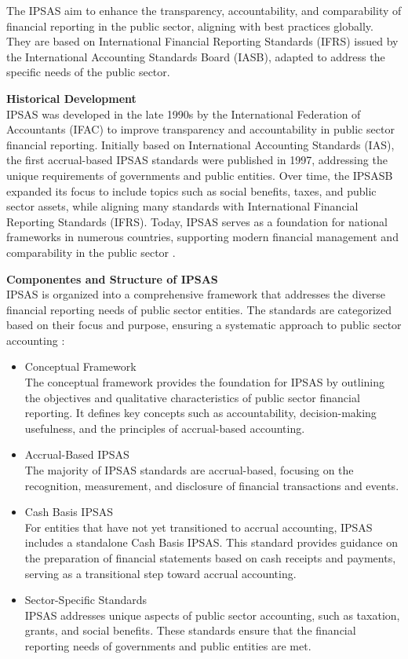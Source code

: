 \documentclass[10pt]{article}
\begin{document}
The IPSAS aim to enhance the transparency, accountability, and comparability of financial reporting in the public sector, aligning with best practices globally. They are based on International Financial Reporting Standards (IFRS) issued by the International Accounting Standards Board (IASB), adapted to address the specific needs of the public sector.

\textbf{Historical Development}\\
IPSAS was developed in the late 1990s by the International Federation of Accountants (IFAC) to improve transparency and accountability in public sector financial reporting. Initially based on International Accounting Standards (IAS), the first accrual-based IPSAS standards were published in 1997, addressing the unique requirements of governments and public entities. Over time, the IPSASB expanded its focus to include topics such as social benefits, taxes, and public sector assets, while aligning many standards with International Financial Reporting Standards (IFRS). Today, IPSAS serves as a foundation for national frameworks in numerous countries, supporting modern financial management and comparability in the public sector \cite{IfacIpsasHistory}.

\textbf{Componentes and Structure of IPSAS}\\
IPSAS is organized into a comprehensive framework that addresses the diverse financial reporting needs of public sector entities. The standards are categorized based on their focus and purpose, ensuring a systematic approach to public sector accounting  \cite{IPSASComoponents}: 

\begin{itemize}
    \item Conceptual Framework\\
The conceptual framework provides the foundation for IPSAS by outlining the objectives and qualitative characteristics of public sector financial reporting. It defines key concepts such as accountability, decision-making usefulness, and the principles of accrual-based accounting.

    \item Accrual-Based IPSAS\\
The majority of IPSAS standards are accrual-based, focusing on the recognition, measurement, and disclosure of financial transactions and events.

    \item Cash Basis IPSAS\\
For entities that have not yet transitioned to accrual accounting, IPSAS includes a standalone Cash Basis IPSAS. This standard provides guidance on the preparation of financial statements based on cash receipts and payments, serving as a transitional step toward accrual accounting.

    \item Sector-Specific Standards\\
IPSAS addresses unique aspects of public sector accounting, such as taxation, grants, and social benefits. These standards ensure that the financial reporting needs of governments and public entities are met.

\end{itemize}
\end{document}

